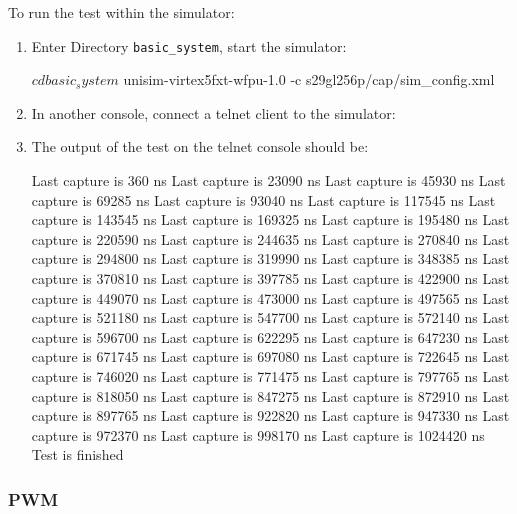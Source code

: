 \noindent To run the test within the simulator:
\begin{enumerate}
\item Enter Directory \texttt{basic\_system}, start the simulator:
\begin{script}
$ cd basic_system
$ unisim-virtex5fxt-wfpu-1.0 -c s29gl256p/cap/sim_config.xml
\end{script}
\item In another console, connect a telnet client to the simulator:
\item The output of the test on the telnet console should be:
\begin{script}
Last capture is 360 ns
Last capture is 23090 ns
Last capture is 45930 ns
Last capture is 69285 ns
Last capture is 93040 ns
Last capture is 117545 ns
Last capture is 143545 ns
Last capture is 169325 ns
Last capture is 195480 ns
Last capture is 220590 ns
Last capture is 244635 ns
Last capture is 270840 ns
Last capture is 294800 ns
Last capture is 319990 ns
Last capture is 348385 ns
Last capture is 370810 ns
Last capture is 397785 ns
Last capture is 422900 ns
Last capture is 449070 ns
Last capture is 473000 ns
Last capture is 497565 ns
Last capture is 521180 ns
Last capture is 547700 ns
Last capture is 572140 ns
Last capture is 596700 ns
Last capture is 622295 ns
Last capture is 647230 ns
Last capture is 671745 ns
Last capture is 697080 ns
Last capture is 722645 ns
Last capture is 746020 ns
Last capture is 771475 ns
Last capture is 797765 ns
Last capture is 818050 ns
Last capture is 847275 ns
Last capture is 872910 ns
Last capture is 897765 ns
Last capture is 922820 ns
Last capture is 947330 ns
Last capture is 972370 ns
Last capture is 998170 ns
Last capture is 1024420 ns
Test is finished
\end{script}
\end{enumerate}

\subsubsection{PWM}


